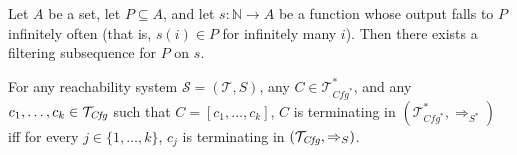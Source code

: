 \begin{lemma}\label{lem:filteringSubsequenceExistsForInfinite}
    Let $A$ be a set, let $P \subseteq A$, and let $s : \mathbb{N} \to A$ be a function whose output
    falls to $P$ infinitely often (that is, $s(i) \in P$ for infinitely many $i$).
    Then there exists a filtering subsequence for $P$ on $s$.
\end{lemma}

\begin{lemma}\label{lem:terminationComposite}
    For any reachability system $\mathcal{S} = (\mathcal{T}, S)$, any $C \in \mathcal{T}^*_{\mathit{Cfg}^*}$,
    and any $c_1,\ldots,c_k \in \mathcal{T}_{\mathit{Cfg}}$ such that
    $C = [c_1,\ldots,c_k]$, $C$ is terminating in $(\mathcal{T}^*_{\mathit{Cfg}^*}, \Rightarrow_{S^*})$
    iff for every $j \in \{ 1, \ldots, k \}$, $c_j$ is terminating in $(\mathcal{T}_{\mathit{Cfg}}, \Rightarrow_S)$.
\end{lemma}

